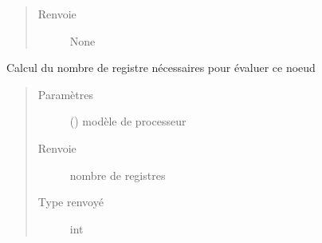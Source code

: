 \documentclass[letterpaper,10pt,french]{sphinxmanual}
\begin{document}
\begin{fulllineitems}
\begin{fulllineitems}
\begin{quote}
\begin{description}
\item[{Renvoie}] \leavevmode
None

\end{description}\end{quote}

\end{fulllineitems}


\begin{fulllineitems}
\label{\detokenize{arithmeticexpressionnodes:arithmeticexpressionnodes.BinaryArithmeticNode.getRegisterCost}}
Calcul du nombre de registre nécessaires pour évaluer ce noeud
\begin{quote}\begin{description}
\item[{Paramètres}] \leavevmode
{} ({\hyperref[\detokenize{processorengine:processorengine.ProcessorEngine}]{}}) \textendash{} modèle de processeur

\item[{Renvoie}] \leavevmode
nombre de registres

\item[{Type renvoyé}] \leavevmode
int


\end{description}
\end{quote}
\end{fulllineitems}
\end{fulllineitems}
\end{document}
